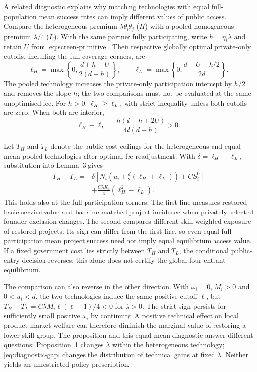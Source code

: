 A related diagnostic explains why matching technologies with equal full-population mean success rates can imply different values of public access. Compare the heterogeneous premium $\lambda\theta_i\theta_j$ ($H$) with a pooled homogeneous premium $\lambda/4$ ($L$). With the same partner fully participating, write $h=\eta_i\lambda$ and retain $U$ from \eqref{eq:screen-primitive}. Their respective globally optimal private-only cutoffs, including the full-coverage corners, are
\begin{equation}
 \ell_H=\max\left\{0,\frac{d+h-U}{2(d+h)}\right\},\qquad
 \ell_L=\max\left\{0,\frac{d-U-h/2}{2d}\right\}.
 \label{eq:diagnostic-cuts}
\end{equation}
The pooled technology increases the private-only participation intercept by $h/2$ and removes the slope $h$; the two comparisons must not be evaluated at the same unoptimised fee. For $h>0$, $\ell_H\geq\ell_L$, with strict inequality unless both cutoffs are zero. When both are interior,
\begin{equation}
 \ell_H-\ell_L=\frac{h(d+h+2U)}{4d(d+h)}>0.
 \label{eq:diagnostic-cutgap}
\end{equation}

Let $T_H$ and $T_L$ denote the public cost ceilings for the heterogeneous and equal-mean pooled technologies after optimal fee readjustment. With $\delta=\ell_H-\ell_L$, substitution into Lemma~3 gives
\begin{equation}
 \begin{split}
 T_H-T_L={}&\delta\left[N_i\left(u_i+\frac d2(\ell_H+\ell_L)\right)
                         +CS_i^0\right]\\
 &+\frac{C\lambda K_i}{4}(\ell_H^2-\ell_L).
 \end{split}
 \label{eq:diagnostic-gap}
\end{equation}
This holds also at the full-participation corners. The first line measures restored basic-service value and baseline matched-project incidence when privately selected founder exclusion changes. The second compares different skill-weighted exposure of restored projects. Its sign can differ from the first line, so even equal full-participation mean project success need not imply equal equilibrium access value. If a fixed government cost lies strictly between $T_H$ and $T_L$, the conditional public-entry decision reverses; this alone does not certify the global four-entrant equilibrium.

The comparison can also reverse in the other direction. With $\omega_i=0$, $M_i>0$ and $0<u_i<d$, the two technologies induce the same positive cutoff $\ell$, but
$T_H-T_L=C\lambda M_i\ell(\ell-1)/4<0$ for $\lambda>0$.
The strict sign persists for sufficiently small positive $\omega_i$ by continuity. A positive technical effect on local product-market welfare can therefore diminish the marginal value of restoring a lower-skill group. The proposition and this equal-mean diagnostic answer different questions: Proposition~1 changes $\lambda$ within the heterogeneous technology; \eqref{eq:diagnostic-gap} changes the distribution of technical gains at fixed $\lambda$. Neither yields an unrestricted policy prescription.
